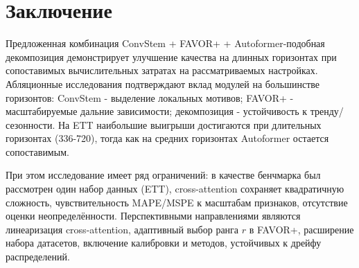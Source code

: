 \section{Заключение}

Предложенная комбинация ConvStem + FAVOR+ + Autoformer-подобная декомпозиция демонстрирует 
улучшение качества на длинных горизонтах при сопоставимых вычислительных затратах 
на рассматриваемых настройках. Абляционные исследования подтверждают вклад 
модулей на большинстве горизонтов: ConvStem - выделение локальных мотивов; FAVOR+ - 
масштабируемые дальние зависимости; декомпозиция - устойчивость к тренду/сезонности. 
На ETT наибольшие выигрыши достигаются при длительных горизонтах (336-720), тогда как 
на средних горизонтах Autoformer остается сопоставимым. 

При этом исследование имеет ряд ограничений: в качестве бенчмарка был рассмотрен один 
набор данных (ETT), 
cross-attention сохраняет квадратичную сложность, чувствительность MAPE/MSPE к масштабам признаков, 
отсутствие оценки неопределённости. Перспективными направлениями являются
линеаризация cross-attention, адаптивный выбор ранга $r$ в FAVOR+, расширение набора датасетов, 
включение калибровки и методов, устойчивых к дрейфу распределений.
